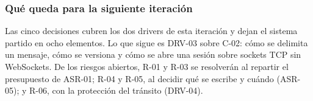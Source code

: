 \subsubsection*{Qué queda para la siguiente iteración}

Las cinco decisiones cubren los dos drivers de esta iteración y dejan el sistema partido en ocho elementos. Lo que sigue es DRV-03 sobre C-02: cómo se delimita un mensaje, cómo se versiona y cómo se abre una sesión sobre sockets TCP sin WebSockets. De los riesgos abiertos, R-01 y R-03 se resolverán al repartir el presupuesto de ASR-01; R-04 y R-05, al decidir qué se escribe y cuándo (ASR-05); y R-06, con la protección del tránsito (DRV-04).
